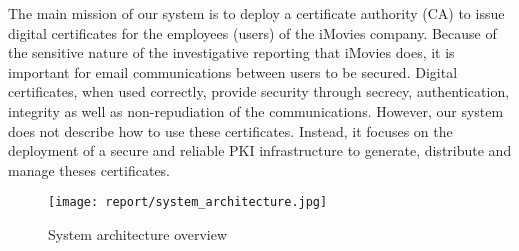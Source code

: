 \documentclass[english]{article}
\begin{document}
The main mission of our system is to deploy a certificate authority (CA) to issue digital certificates for the employees (users) of the iMovies company. Because of the sensitive nature of the investigative reporting that iMovies does, it is important for email communications between users to be secured. Digital certificates, when used correctly, provide security through secrecy, authentication, integrity as well as non-repudiation of the communications. However, our system does not describe how to use these certificates. Instead, it focuses on the deployment of a secure and reliable PKI infrastructure to generate, distribute and manage theses certificates.

\begin{figure}
  \texttt{[image: report/system\_architecture.jpg]}
  \caption{System architecture overview}
  \label{fig:system_architecture}
\end{figure}
\end{document}
